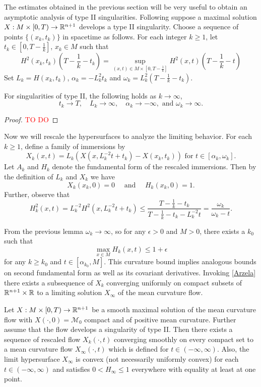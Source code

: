     The estimates obtained in the previous section will be very useful to obtain an asymptotic analysis of type II singularities. Following \cite{huisken1999mean} suppose a maximal solution  $X : M \times [0,T) \to \mathbb{R}^{n+1} $ develops a type II singularity. Choose a sequence of points $ \{(x_{k},t_{k})\} $ in spacetime as follows. For each integer $ k \ge 1 $, let $ t_{k} \in [0,T-\frac{1}{k}] $, $ x_{k} \in M $ such that \begin{equation}
        H^{2}(x_{k},t_{k})\left( T- \frac{1}{k}-t_{k} \right) = \sup_{(x,t) \in M \times\left[0,T-\frac{1}{k}\right]}H^{2}(x,t)\left(  T- \frac{1}{k}- t\right)
    \end{equation}
    Set $ L_{k} = H(x_{k},t_{k}) $, $ \alpha_{k} = -L^{2}_{k}t_{k} $ and $ \omega_{k} = L_{k}^{2}(T-\frac{1}{k}-t_{k}) $. 
    \begin{lemma}
        For singularities of type II, the following holds as $ k \to \infty $, 
        \[ t_{k} \to T, \quad L_{k} \to \infty,\quad  \alpha_{k} \to -\infty,\text{ and } \omega_{k} \to \infty .\]
    \end{lemma}
    \begin{proof}
        \textcolor{red}{TO DO}
    \end{proof}
    Now we will rescale the hypersurfaces to analyze the limiting behavior. For each $ k \ge 1 $, define a family of immersions by 
    \[ X_{k}(x, t) = L_{k}(X(x, L_{k}^{-2}t+t_{k})-X(x_{k},t_{k}))  \text{ for } t \in [\alpha_{k}, \omega_{k}].\]
    Let $ A_{k} $ and $ H_{k} $ denote the fundamental form of the rescaled immersions. Then by the definition of $ L_{k} $ and $ X_{k} $ we have 
    \[ X_{k}(x_{k},0) = 0 \quad \text{ and }\quad H_{k}(x_{k},0)=1.\]
    Further,  observe that 
    \[ H_{k}^{2}(x,t) = L_{k}^{-2}H^{2}(x, L_{k}^{-2}t+t_{k}) \le \frac{T - \frac{1}{k}-t_{k}}{T-\frac{1}{k}-t_{k}-L_{k}^{-2}t} = \frac{\omega_{k}}{\omega_{k}-t}. \]

    From the previous lemma $ \omega_{k} \to \infty $, so for any $ \epsilon >0 $ and $ M >0 $, there exists a $ k_{0} $ such that 
    \[ \max_{x \in M} H_{k}(x,t) \le 1+\epsilon \]
    for any $ k \ge k_{0} $ and $ t \in [\alpha_{k_{0}}, M] $. This curvature bound implies analogous bounds on second fundamental form as well as its covariant derivatives. Invoking \cref{Arzela} there exists a subsequence of $ X_{k} $ converging uniformly on compact subsets of $ \mathbb{R}^{n+1} \times \mathbb{R} $ to a limiting solution $ X_{\infty} $ of the mean curvature flow. 
     
    \begin{thm}
        Let $ X : M \times [0,T) \to \mathbb{R}^{n+1}$ be a smooth maximal solution of the mean curvature flow with $ X(\cdot,0) = \mathcal{M}_{0} $ compact and of positive mean curvature. Further assume that the flow develops a singularity of type II. Then there exists a sequence of rescaled flow $ X_{k}(\cdot,t) $ converging smoothly on every compact set to a mean curvature flow $ X_{\infty}(\cdot, t) $ which is defined for $ t \in (-\infty, \infty) $. Also, the limit hypersurface $ X_{\infty} $ is convex (not necessarily uniformly convex) for each $ t \in (-\infty, \infty)  $ and satisfies $ 0< H_{\infty}\le 1 $ everywhere with equality at least at one point. 
    \end{thm}